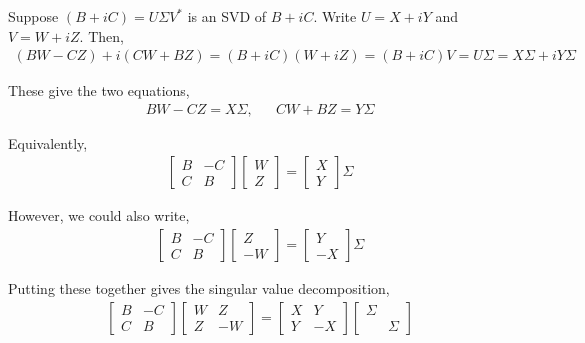 \documentclass[10pt]{article}
\begin{document}
\begin{solution}[Solution]
Suppose \( (B+iC) = U \Sigma V^* \) is an SVD of \( B+iC \). Write \( U = X+iY \) and \( V = W+iZ \). Then,
\begin{align*}
    (BW - CZ) + i(CW + BZ)
    = (B+iC)(W+iZ)
    = (B+iC)V
    = U \Sigma
    = X \Sigma + i Y \Sigma
\end{align*}

These give the two equations,
\begin{align*}
    BW - CZ = X \Sigma  , && CW + BZ = Y \Sigma
\end{align*}

Equivalently,
\begin{align*}
    \left[\begin{array}{cc}B & -C \\ C & B\end{array}\right]
    \left[\begin{array}{c}W \\ Z\end{array}\right]
    = \left[\begin{array}{c}X \\ Y\end{array}\right]
    \Sigma %
\end{align*}

However, we could also write,
\begin{align*}
\left[\begin{array}{cc}B & -C \\ C & B\end{array}\right]
\left[\begin{array}{c} Z \\ -W\end{array}\right]
= \left[\begin{array}{c}Y \\ -X\end{array}\right]
\Sigma
\end{align*}

Putting these together gives the singular value decomposition,
\begin{align*}
    \left[\begin{array}{cc}B & -C \\ C & B\end{array}\right]
    \left[\begin{array}{cc}W & Z \\ Z & -W \end{array}\right]
    = \left[\begin{array}{cc}X & Y \\ Y & -X\end{array}\right]
    \left[\begin{array}{cc}\Sigma \\ & \Sigma\end{array}\right]
\end{align*}


\end{solution}
\end{document}
